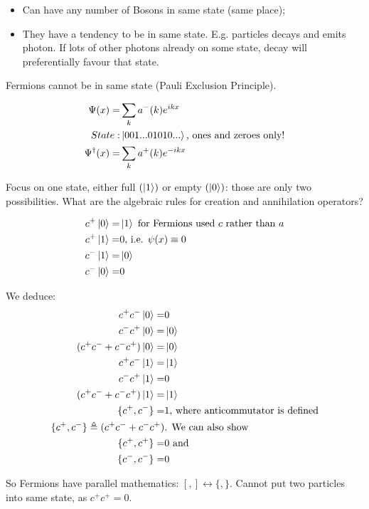 \documentclass[]{article}
\begin{document}
\begin{itemize}
	\item Can have any number of Bosons in same state (same place);
	\item They have a tendency to be in same state. E.g. particles decays and emits photon. If lots of other photons already on some state, decay will preferentially favour that state.
\end{itemize}

Fermions cannot be in same state (Pauli Exclusion Principle).

\begin{align*}
\Psi(x) =& \sum_k a^-(k) e^{ikx}\\
State:& \ket{001...01010...} \text{, ones and zeroes only!}\\
\Psi^\dagger(x) =& \sum_k a^+(k) e^{-ikx}
\end{align*}

Focus on one state, either full $(\ket{1})$ or empty $(\ket{0})$: those are only two possibilities. What are the algebraic rules for creation and annihilation operators?

\begin{align*}
c^+\ket{0} =& \ket{1} \text{ for Fermions used $c$ rather than $a$}\\
c^+\ket{1} =& 0 \text{, i.e. $\psi(x) \equiv 0$}\\
c^-\ket{1} =& \ket{0}\\
c^-\ket{0} =& 0\\
\end{align*}

We deduce:
\begin{align*}
c^+c^-\ket{0} =& 0\\
c^-c^+\ket{0} =& \ket{0}\\
(c^+c^-+c^-c^+)\ket{0} =& \ket{0}\\
c^+c^-\ket{1} =& \ket{1} \\
c^-c^+\ket{1} =&0 \\
(c^+c^-+c^-c^+)\ket{1} =& \ket{1}\\
\{c^+,c^-\} =& 1 \text{, where anticommutator is defined}\\
\{c^+,c^-\} \triangleq(c^+c^-+c^-c^+)& \text{. We can also show}\\
\{c^+,c^+\} =&0 \text{ and}\\
\{c^-,c^-\} =&0
\end{align*}

So Fermions have parallel mathematics: $[,] \leftrightarrow \{,\}$. Cannot put two particles into same state, as $c^+c^+=0$.
\end{document}
